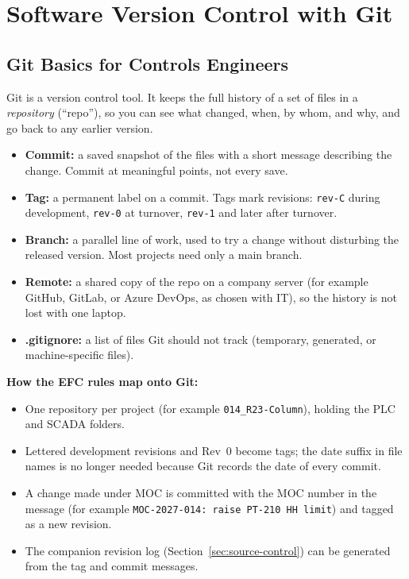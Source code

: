 \chapter{Software Version Control with Git}
\label{app:git}

\section{Git Basics for Controls Engineers}
Git is a version control tool. It keeps the full history of a set of files in a \emph{repository} (``repo''), so you can see what changed, when, by whom, and why, and go back to any earlier version.
\begin{itemize}[itemsep=1pt]
  \item \textbf{Commit:} a saved snapshot of the files with a short message describing the change. Commit at meaningful points, not every save.
  \item \textbf{Tag:} a permanent label on a commit. Tags mark revisions: \texttt{rev-C} during development, \texttt{rev-0} at turnover, \texttt{rev-1} and later after turnover.
  \item \textbf{Branch:} a parallel line of work, used to try a change without disturbing the released version. Most projects need only a main branch.
  \item \textbf{Remote:} a shared copy of the repo on a company server (for example GitHub, GitLab, or Azure DevOps, as chosen with IT), so the history is not lost with one laptop.
  \item \textbf{.gitignore:} a list of files Git should not track (temporary, generated, or machine-specific files).
\end{itemize}

\textbf{How the EFC rules map onto Git:}
\begin{itemize}[itemsep=1pt]
  \item One repository per project (for example \texttt{014\_R23-Column}), holding the PLC and SCADA folders.
  \item Lettered development revisions and Rev~0 become tags; the date suffix in file names is no longer needed because Git records the date of every commit.
  \item A change made under MOC is committed with the MOC number in the message (for example \texttt{MOC-2027-014: raise PT-210 HH limit}) and tagged as a new revision.
  \item The companion revision log (Section~\ref{sec:source-control}) can be generated from the tag and commit messages.
\end{itemize}

